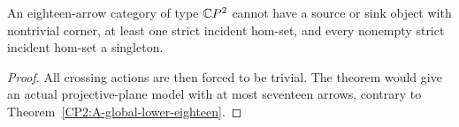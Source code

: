 \begin{corollary}
\label{CP2:A-singleton-extreme-eighteen}
An eighteen-arrow category of type $\mathbb{C}P^2$ cannot have a
source or sink object with nontrivial corner, at least one
strict incident hom-set, and every nonempty strict incident
hom-set a singleton.
\end{corollary}
\begin{proof}
All crossing actions are then forced to be trivial. The
theorem would give an actual projective-plane model with
at most seventeen arrows, contrary to
Theorem~\ref{CP2:A-global-lower-eighteen}.
\end{proof}
